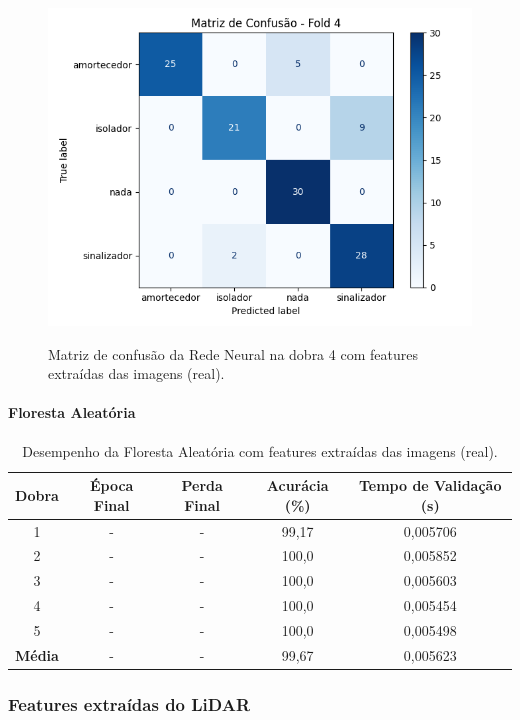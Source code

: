 \begin{figure}[H]
\caption{Matriz de confusão da Rede Neural na dobra 4 com features extraídas das imagens (real).}
\centering
\includegraphics[width=0.7\linewidth]{figuras/Resultados/real_principal_Teste3_nn.png}
\fonte{}
\label{fig:matriz_confusao_rn_imagens_real}
\end{figure}


\paragraph{Floresta Aleatória}

\begin{table}[H]
\caption{Desempenho da Floresta Aleatória com features extraídas das imagens (real).}
\centering
\begin{tabular}{ccccc}
\hline
\textbf{Dobra} & \textbf{Época Final} & \textbf{Perda Final} & \textbf{Acurácia (\%)} & \textbf{Tempo de Validação (s)}  \\
\hline
1 & - & - & 99,17 & 0,005706 \\
2 & - & - & 100,0 & 0,005852 \\
3 & - & - & 100,0 & 0,005603 \\
4 & - & - & 100,0 & 0,005454 \\
5 & - & - & 100,0 & 0,005498 \\
\hline
\textbf{Média} & - & - & 99,67 & 0,005623 \\
\hline
\end{tabular}
\fonte{}
\label{tab:rf_features_imagens_real}
\end{table}


\subsubsection{Features extraídas do LiDAR}

